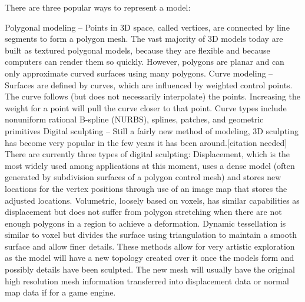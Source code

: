 There are three popular ways to represent a model:

Polygonal modeling – Points in 3D space, called vertices, are connected by line segments to form a polygon mesh. The vast
majority of 3D models today are built as textured polygonal models, because they are flexible and because computers can
render them so quickly. However, polygons are planar and can only approximate curved surfaces using many polygons.
Curve modeling – Surfaces are defined by curves, which are influenced by weighted control points. The curve follows (but
does not necessarily interpolate) the points. Increasing the weight for a point will pull the curve closer to that point.
Curve types include nonuniform rational B-spline (NURBS), splines, patches, and geometric primitives
Digital sculpting – Still a fairly new method of modeling, 3D sculpting has become very popular in the few years it has
been around.[citation needed] There are currently three types of digital sculpting: Displacement, which is the most widely
used among applications at this moment, uses a dense model (often generated by subdivision surfaces of a polygon control
mesh) and stores new locations for the vertex positions through use of an image map that stores the adjusted locations.
Volumetric, loosely based on voxels, has similar capabilities as displacement but does not suffer from polygon stretching
when there are not enough polygons in a region to achieve a deformation. Dynamic tessellation is similar to voxel but divides
the surface using triangulation to maintain a smooth surface and allow finer details. These methods allow for very artistic
exploration as the model will have a new topology created over it once the models form and possibly details have been sculpted.
The new mesh will usually have the original high resolution mesh information transferred into displacement data or normal map
data if for a game engine.

